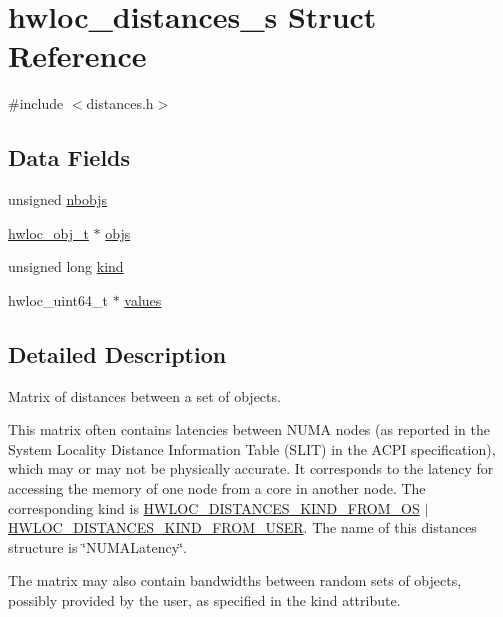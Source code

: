 \hypertarget{a00310}{}\section{hwloc\+\_\+distances\+\_\+s Struct Reference}
\label{a00310}


{\ttfamily \#include $<$distances.\+h$>$}

\subsection*{Data Fields}
\begin{DoxyCompactItemize}
\item 
unsigned \hyperlink{a00310_a4ca2af858cebbce7324ec49903d09474}{nbobjs}
\item 
\hyperlink{a00185_ga79b8ab56877ef99ac59b833203391c7d}{hwloc\+\_\+obj\+\_\+t} $\ast$ \hyperlink{a00310_af1e78b2d628d191fa6cae3fbfe891078}{objs}
\item 
unsigned long \hyperlink{a00310_aef9c83cf467da1b1fa4c36493febb3b5}{kind}
\item 
hwloc\+\_\+uint64\+\_\+t $\ast$ \hyperlink{a00310_ae43e19b2c743de05c93d71a30beaca75}{values}
\end{DoxyCompactItemize}


\subsection{Detailed Description}
Matrix of distances between a set of objects. 

This matrix often contains latencies between N\+U\+MA nodes (as reported in the System Locality Distance Information Table (S\+L\+IT) in the A\+C\+PI specification), which may or may not be physically accurate. It corresponds to the latency for accessing the memory of one node from a core in another node. The corresponding kind is \hyperlink{a00208_ggab1bb10d3adb85b52cdc6fe5a7f74f108a90dc38248c8d5392d4dd3e88f391e984}{H\+W\+L\+O\+C\+\_\+\+D\+I\+S\+T\+A\+N\+C\+E\+S\+\_\+\+K\+I\+N\+D\+\_\+\+F\+R\+O\+M\+\_\+\+OS} $\vert$ \hyperlink{a00208_ggab1bb10d3adb85b52cdc6fe5a7f74f108a0148d7f9be833a04f5a55455437c227b}{H\+W\+L\+O\+C\+\_\+\+D\+I\+S\+T\+A\+N\+C\+E\+S\+\_\+\+K\+I\+N\+D\+\_\+\+F\+R\+O\+M\+\_\+\+U\+S\+ER}. The name of this distances structure is \char`\"{}\+N\+U\+M\+A\+Latency\char`\"{}.

The matrix may also contain bandwidths between random sets of objects, possibly provided by the user, as specified in the {\ttfamily kind} attribute. 

